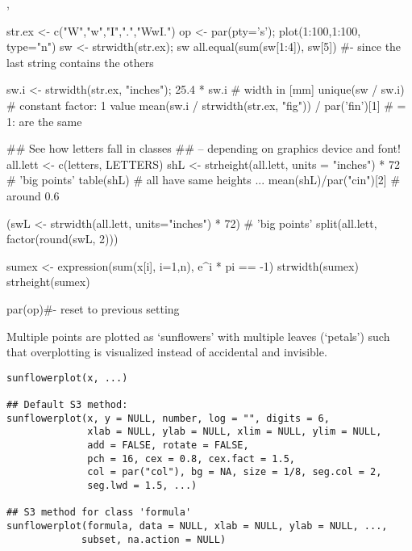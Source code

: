 %
\begin{SeeAlso}\relax
{}, 
\end{SeeAlso}
%
\begin{Examples}
\begin{ExampleCode}
str.ex <- c("W","w","I",".","WwI.")
op <- par(pty='s'); plot(1:100,1:100, type="n")
sw <- strwidth(str.ex); sw
all.equal(sum(sw[1:4]), sw[5])
#- since the last string contains the others

sw.i <- strwidth(str.ex, "inches"); 25.4 * sw.i # width in [mm]
unique(sw / sw.i)
# constant factor: 1 value
mean(sw.i / strwidth(str.ex, "fig")) / par('fin')[1] # = 1: are the same

## See how letters fall in classes
##  -- depending on graphics device and font!
all.lett <- c(letters, LETTERS)
shL <- strheight(all.lett, units = "inches") * 72 # 'big points'
table(shL) # all have same heights ...
mean(shL)/par("cin")[2] # around 0.6

(swL <- strwidth(all.lett, units="inches") * 72) # 'big points'
split(all.lett, factor(round(swL, 2)))

sumex <- expression(sum(x[i], i=1,n), e^{i * pi} == -1)
strwidth(sumex)
strheight(sumex)

par(op)#- reset to previous setting
\end{ExampleCode}
\end{Examples}
%
\begin{Description}\relax
Multiple points are plotted as `sunflowers' with multiple leaves
(`petals') such that overplotting is visualized instead of
accidental and invisible.
\end{Description}
%
\begin{Usage}
\begin{verbatim}
sunflowerplot(x, ...)

## Default S3 method:
sunflowerplot(x, y = NULL, number, log = "", digits = 6,
              xlab = NULL, ylab = NULL, xlim = NULL, ylim = NULL,
              add = FALSE, rotate = FALSE,
              pch = 16, cex = 0.8, cex.fact = 1.5,
              col = par("col"), bg = NA, size = 1/8, seg.col = 2,
              seg.lwd = 1.5, ...)

## S3 method for class 'formula'
sunflowerplot(formula, data = NULL, xlab = NULL, ylab = NULL, ...,
             subset, na.action = NULL)
\end{verbatim}
\end{Usage}
